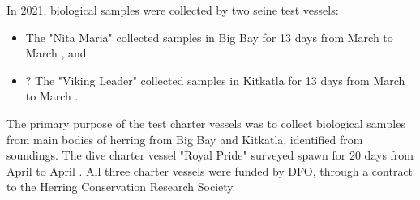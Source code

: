 In 2021, biological samples were collected by two seine test vessels:
\begin{itemize}
\item The "Nita Maria" collected samples in Big Bay for 13 days from March  to March , and
\item? The "Viking Leader" collected samples in Kitkatla for 13 days from March  to March .
\end{itemize}
The primary purpose of the test charter vessels was to collect biological samples
from main bodies of herring from Big Bay and Kitkatla, identified from soundings.
The dive charter vessel "Royal Pride" surveyed spawn for 20 days from April  to April .
All three charter vessels were funded by DFO, through a contract to the Herring Conservation Research Society.
